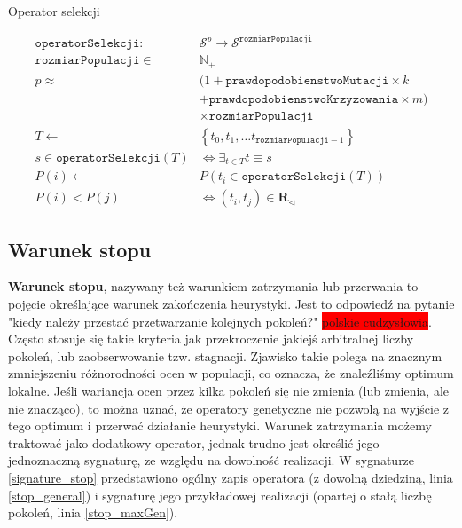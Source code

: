 \documentclass[twoside]{iisthesis}
\newcommand{\todo}{\colorbox{red}}
\newcommand{\numberSet}{\mathbb}
\newcommand{\important}{\mathcal}
\newcommand{\R}{\mathbf{R}}
\newcommand{\minoritySpecimenRel}{{\R}_{\lhd}}
\newcommand{\param}{\mathtt}
\begin{document}
\begin{signature}
	\caption{Operator selekcji \label{signature_selection}}
	\begin{align}
	\param{operatorSelekcji}: &\important{S}^p \rightarrow \important{S}^{\param{rozmiarPopulacji}} \\
	\param{rozmiarPopulacji} \in &\numberSet{N}_{+} \\
	\label{p_start} 
	p \approx &(1 + \param{prawdopodobienstwoMutacji} \times k \\
	          &+ \param{prawdopodobienstwoKrzyzowania} \times m) \\
	\label{p_stop} 
	&\times \param{rozmiarPopulacji} \\
	\label{constraint_sel_start}          
	T \gets &\left\{ t_0, t_1, \ldots t_{\param{rozmiarPopulacji}-1} \right\} \\
	s \in \param{operatorSelekcji}(T) &\Leftrightarrow \exists_{t \in T}  t \equiv s \\
	P(i) \gets &P(t_i \in \param{operatorSelekcji}(T)) \\
	\label{constraint_sel_stop} 
	P(i) < P(j) &\Leftrightarrow (t_i, t_j) \in \minoritySpecimenRel
	\end{align}
\end{signature}

\subsection{Warunek stopu} \label{subsection_stop}

\textbf{Warunek stopu}, nazywany też warunkiem zatrzymania lub przerwania to pojęcie określające warunek zakończenia heurystyki. Jest to odpowiedź na pytanie "kiedy należy przestać przetwarzanie kolejnych pokoleń?" \todo{polskie cudzysłowia}. Często stosuje się takie kryteria jak przekroczenie jakiejś arbitralnej liczby pokoleń, lub zaobserwowanie tzw. stagnacji. Zjawisko takie polega na znacznym zmniejszeniu różnorodności ocen w populacji, co oznacza, że znaleźliśmy optimum lokalne. Jeśli wariancja ocen przez kilka pokoleń się nie zmienia (lub zmienia, ale nie znacząco), to można uznać, że operatory genetyczne nie pozwolą na wyjście z tego optimum i przerwać działanie heurystyki. 
Warunek zatrzymania możemy traktować jako dodatkowy operator, jednak trudno jest określić jego jednoznaczną sygnaturę, ze względu na dowolność realizacji. W sygnaturze \ref{signature_stop} przedstawiono ogólny zapis operatora (z dowolną dziedziną, linia \ref{stop_general}) i sygnaturę jego przykładowej realizacji (opartej o stałą liczbę pokoleń, linia \ref{stop_maxGen}).
\end{document}
